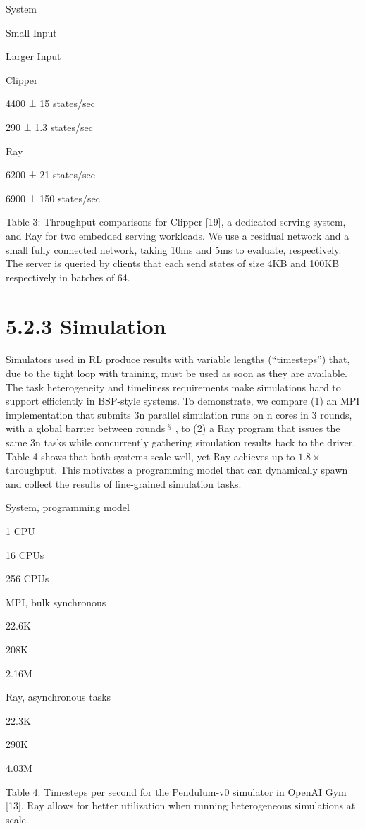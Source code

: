 \documentclass[
]{article}
\begin{document}
System

Small Input

Larger Input

Clipper

4400 ± 15 states/sec

290 ± 1.3 states/sec

Ray

6200 ± 21 states/sec

6900 ± 150 states/sec

Table 3: Throughput comparisons for Clipper {[}19{]}, a dedicated
serving system, and Ray for two embedded serving workloads. We use a
residual network and a small fully connected network, taking 10ms and
5ms to evaluate, respectively. The server is queried by clients that
each send states of size 4KB and 100KB respectively in batches of 64.

\section{5.2.3 Simulation}\label{simulation}

Simulators used in RL produce results with variable lengths
(``timesteps'') that, due to the tight loop with training, must be used
as soon as they are available. The task heterogeneity and timeliness
requirements make simulations hard to support efficiently in BSP-style
systems. To demonstrate, we compare (1) an MPI implementation that
submits 3n parallel simulation runs on n cores in 3 rounds, with a
global barrier between rounds \(^{§}\) , to (2) a Ray program that
issues the same 3n tasks while concurrently gathering simulation results
back to the driver. Table 4 shows that both systems scale well, yet Ray
achieves up to \(1.8\times\) throughput. This motivates a programming
model that can dynamically spawn and collect the results of fine-grained
simulation tasks.

System, programming model

1 CPU

16 CPUs

256 CPUs

MPI, bulk synchronous

22.6K

208K

2.16M

Ray, asynchronous tasks

22.3K

290K

4.03M

Table 4: Timesteps per second for the Pendulum-v0 simulator in OpenAI
Gym {[}13{]}. Ray allows for better utilization when running
heterogeneous simulations at scale.
\end{document}
